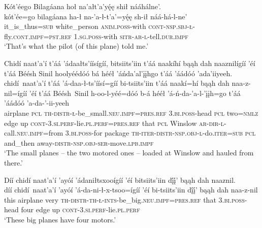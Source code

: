 \ea\label{ex:text9-11-13}
Kót’éego Bilagáana hoł na’ałt’a’yę́ę shił nááhálne’.\\
\gll kót’ée=go	bilagáana	ha-ł	na-’a-ł-t’a’=yę́ę	sh-ił	náá-há-l-ne’\\
     it\_is\_thus=\textsc{sub}	white\_person	\textsc{anim}.\textsc{poss}-with	\textsc{cont}-\textsc{nsp}.\textsc{sbj}-\textsc{ł}-fly.\textsc{cont}.\textsc{impf}=\textsc{pst}.\textsc{ref}	1.\textsc{sg}.\textsc{poss}-with	\textsc{sitr}-\textsc{ar}-\textsc{l}-tell.\textsc{dur}.\textsc{impf}\\
\glt `That's what the pilot (of this plane) told me.'
\z

\ea\label{ex:text9-12-1}
Chidí naat’a’í t’áá ’ádaałts’íísígíí, bitsiits’iin t’áá naakíhí bąąh dah naaznilígíí ’éí t’áá Béésh Sinil hoolyéédóó bá hééł ’áńda’al’įįhgo t’áá ’áádóó ’ada’iiyeeh.\\
\gll chidí~{naat’a’í}	t’áá	’á-daa-ł-ts’íísí=gíí	bi-tsiits’iin	t’áá	naakí=hí	bąąh	dah	naa-z-nil=ígíí	’éí	t’áá	Béésh~{Sinil}	h-oo-l-yéé=dóó	b-á	hééł	’á-ń-da-’a-l-’įįh=go	t’áá	’áádóó	’a-da-’-ii-yeeh\\
     airplane	\textsc{pcl}	\textsc{th}-\textsc{distr}-\textsc{ł}-be\_small.\textsc{neu}.\textsc{impf}=\textsc{pres}.\textsc{ref}	3.\textsc{bi}.\textsc{poss}-head	\textsc{pcl}	two=\textsc{nmlz}	edge	up	\textsc{cont}-3.\textsc{si}.\textsc{perf}-lie.\textsc{pl}.\textsc{perf}=\textsc{pres}.\textsc{ref}	that	\textsc{pcl}	Winslow	\textsc{ar}-\textsc{dir}-\textsc{l}-call.\textsc{neu}.\textsc{impf}=from	3.\textsc{bi}.\textsc{poss}-for	package	\textsc{th}-\textsc{iter}-\textsc{distr}-\textsc{nsp}.\textsc{obj}-\textsc{l}-do.\textsc{iter}=\textsc{sub}	\textsc{pcl}	and\_then	away-\textsc{distr}-\textsc{nsp}.\textsc{obj}-\textsc{ser}-move.\textsc{lpb}.\textsc{impf}\\
\glt `The small planes -- the two motored ones -- loaded at Winslow and hauled from there.'
\z

\ea\label{ex:text9-12-2}
Díí chidí naat’a’í ’ayóí ’ádaniłtsxooígíí ’éí bitsiits’iin dį́į́’ bąąh dah naaznil.\\
\gll díí	chidí~{naat’a’í}	’ayóí	’á-da-ni-ł-x-tsoo=ígíí	’éí	bi-tsiits’iin	dį́į́’	bąąh	dah	naa-z-nil\\
     this	airplane	very	\textsc{th}-\textsc{distr}-\textsc{th}-\textsc{ł}-\textsc{ints}-be\_big.\textsc{neu}.\textsc{impf}=\textsc{pres}.\textsc{ref}	that	3.\textsc{bi}.\textsc{poss}-head	four	edge	up	\textsc{cont}-3.\textsc{si}.\textsc{perf}-lie.\textsc{pl}.\textsc{perf}\\
\glt `These big planes have four motors.'
\z


